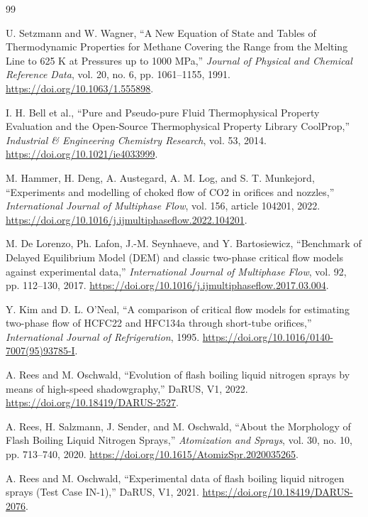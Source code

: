 \documentclass[11pt]{article}
\begin{document}
\begin{thebibliography}{99}

U. Setzmann and W. Wagner,
``A New Equation of State and Tables of Thermodynamic Properties for Methane
Covering the Range from the Melting Line to 625 K at Pressures up to 1000 MPa,''
\emph{Journal of Physical and Chemical Reference Data}, vol. 20, no. 6,
pp. 1061--1155, 1991.
\url{https://doi.org/10.1063/1.555898}.

I. H. Bell et al.,
``Pure and Pseudo-pure Fluid Thermophysical Property Evaluation and the
Open-Source Thermophysical Property Library CoolProp,''
\emph{Industrial \& Engineering Chemistry Research}, vol. 53, 2014.
\url{https://doi.org/10.1021/ie4033999}.

M. Hammer, H. Deng, A. Austegard, A. M. Log, and S. T. Munkejord,
``Experiments and modelling of choked flow of CO2 in orifices and nozzles,''
\emph{International Journal of Multiphase Flow}, vol. 156, article 104201, 2022.
\url{https://doi.org/10.1016/j.ijmultiphaseflow.2022.104201}.

M. De Lorenzo, Ph. Lafon, J.-M. Seynhaeve, and Y. Bartosiewicz,
``Benchmark of Delayed Equilibrium Model (DEM) and classic two-phase critical
flow models against experimental data,''
\emph{International Journal of Multiphase Flow}, vol. 92, pp. 112--130, 2017.
\url{https://doi.org/10.1016/j.ijmultiphaseflow.2017.03.004}.

Y. Kim and D. L. O'Neal,
``A comparison of critical flow models for estimating two-phase flow of HCFC22
and HFC134a through short-tube orifices,''
\emph{International Journal of Refrigeration}, 1995.
\url{https://doi.org/10.1016/0140-7007(95)93785-I}.

A. Rees and M. Oschwald,
``Evolution of flash boiling liquid nitrogen sprays by means of high-speed
shadowgraphy,'' DaRUS, V1, 2022.
\url{https://doi.org/10.18419/DARUS-2527}.

A. Rees, H. Salzmann, J. Sender, and M. Oschwald,
``About the Morphology of Flash Boiling Liquid Nitrogen Sprays,''
\emph{Atomization and Sprays}, vol. 30, no. 10, pp. 713--740, 2020.
\url{https://doi.org/10.1615/AtomizSpr.2020035265}.

A. Rees and M. Oschwald,
``Experimental data of flash boiling liquid nitrogen sprays (Test Case IN-1),''
DaRUS, V1, 2021.
\url{https://doi.org/10.18419/DARUS-2076}.


\end{thebibliography}
\end{document}
